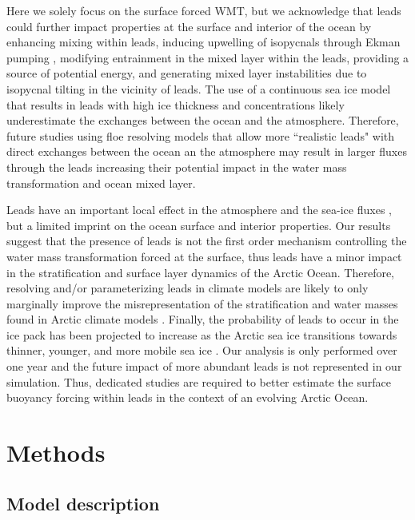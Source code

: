 \documentclass[lineno,sn-basic]{sn-jnl}%
\begin{document}
Here we solely focus on the surface forced WMT, but we acknowledge that leads could further impact properties at the surface and interior of the ocean by enhancing mixing within leads, inducing upwelling of isopycnals through Ekman pumping \citep{McPhee_LKF_2005}, modifying  entrainment in the mixed layer within the leads, providing a source of potential energy, and generating mixed layer instabilities due to isopycnal tilting in the vicinity of leads. The use of a continuous sea ice model that results in leads with high ice thickness and concentrations likely underestimate the exchanges between the ocean and the atmosphere. Therefore, future studies using floe resolving models that allow more ``realistic leads" with direct exchanges between the ocean an the atmosphere may result in larger fluxes through the leads increasing their potential impact in the water mass transformation and ocean mixed layer.

Leads have an important local effect in the atmosphere and the sea-ice fluxes \citep{Marcq_flux_lead_2012, Lupkes_leads_2008, Wettlaufer_insulator_1997, Smith_polynyas_1990}, but a limited imprint on the ocean surface and interior properties. Our results suggest that the presence of leads is not the first order mechanism controlling the water mass transformation forced at the surface, thus leads have a minor impact in the stratification and surface layer dynamics of the Arctic Ocean.
Therefore, resolving and/or parameterizing leads in climate models are likely to only marginally improve the misrepresentation of the stratification and water masses found in Arctic climate models \citep{Wang_ompi_2024,Ilicak_core_2016}. Finally, the probability of leads to occur in the ice pack has been projected to increase as the Arctic sea ice transitions towards thinner, younger, and more mobile sea ice \citep{Boutin_rheology_2023, IPCC_arctic_2022}. Our analysis is only performed over one year and the future impact of more abundant leads is not represented in our simulation. Thus, dedicated studies are required to better estimate the surface buoyancy forcing within leads in the context of an evolving Arctic Ocean.

\section{Methods}
\subsection*{Model description}
\end{document}
